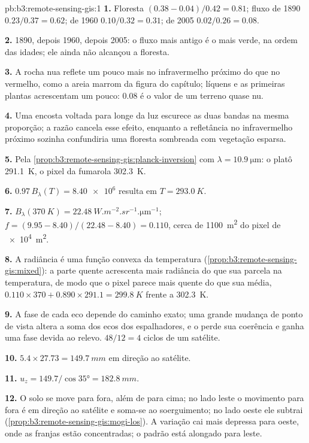 \begin{solution}{pb:b3:remote-sensing-gis:1}
\textbf{1.} Floresta $(0.38 - 0.04)/0.42 = 0.81$; fluxo de 1890 $0.23/0.37 =
0.62$; de 1960 $0.10/0.32 = 0.31$; de 2005 $0.02/0.26 = 0.08$.

\textbf{2.} 1890, depois 1960, depois 2005: o fluxo mais antigo é o mais verde,
na ordem das idades; ele ainda não alcançou a floresta.

\textbf{3.} A rocha nua reflete um pouco mais no infravermelho próximo do que no
vermelho, como a areia marrom da figura do capítulo; líquens e as primeiras
plantas acrescentam um pouco: 0.08 é o valor de um terreno quase nu.

\textbf{4.} Uma encosta voltada para longe da luz escurece as duas bandas na mesma
proporção; a razão cancela esse efeito, enquanto a refletância no infravermelho próximo sozinha
confundiria uma floresta sombreada com vegetação esparsa.

\textbf{5.} Pela \cref{prop:b3:remote-sensing-gis:planck-inversion} com
$\lambda = \qty{10.9}{\micro\metre}$: o platô \qty{291.1}{K}, o
pixel da fumarola \qty{302.3}{K}.

\textbf{6.} $0.97\,B_\lambda(T) = \num{8.40e6}$ resulta em $T = \qty{293.0}{K}$.

\textbf{7.} $B_\lambda(\qty{370}{K}) =
\qty{22.48}{W.m^{-2}.sr^{-1}.\micro\metre^{-1}}$; $f = (9.95 - 8.40)/(22.48
- 8.40) = 0.110$, cerca de \qty{1100}{m^2} do pixel de \qty{e4}{m^2}.

\textbf{8.} A radiância é uma função convexa da temperatura
(\cref{prop:b3:remote-sensing-gis:mixed}): a parte quente acrescenta mais radiância
do que sua parcela na temperatura, de modo que o pixel parece mais quente do que sua média,
$0.110\times370 + 0.890\times291.1 = \qty{299.8}{K}$ frente a
\qty{302.3}{K}.

\textbf{9.} A fase de cada eco depende do caminho exato; uma grande
mudança de ponto de vista altera a soma dos ecos dos espalhadores, e o
 perde sua coerência e ganha uma fase devida ao relevo.
$48/12 = 4$ ciclos de um satélite.

\textbf{10.} $5.4\times27.73 = \qty{149.7}{mm}$ em direção ao satélite.

\textbf{11.} $u_z = 149.7/\cos\ang{35} = \qty{182.8}{mm}$.

\textbf{12.} O solo se move para fora, além de para cima; no lado leste o
movimento para fora é em direção ao satélite e soma-se ao soerguimento; no lado oeste
ele subtrai (\cref{prop:b3:remote-sensing-gis:mogi-los}). A variação
cai mais depressa para oeste, onde as franjas estão concentradas; o padrão está
alongado para leste.


\end{solution}
